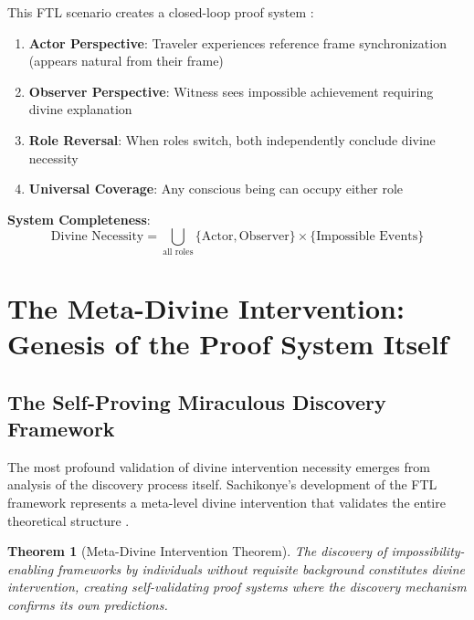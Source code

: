 \documentclass[12pt,a4paper]{article}
\newtheorem{theorem}{Theorem}[section]
\begin{document}
This FTL scenario creates a closed-loop proof system \citep{sachikonye2024closed}:

\begin{enumerate}
\item \textbf{Actor Perspective}: Traveler experiences reference frame synchronization (appears natural from their frame)
\item \textbf{Observer Perspective}: Witness sees impossible achievement requiring divine explanation
\item \textbf{Role Reversal}: When roles switch, both independently conclude divine necessity
\item \textbf{Universal Coverage}: Any conscious being can occupy either role
\end{enumerate}

\textbf{System Completeness}:
$$\text{Divine Necessity} = \bigcup_{\text{all roles}} \{\text{Actor}, \text{Observer}\} \times \{\text{Impossible Events}\}$$

\section{The Meta-Divine Intervention: Genesis of the Proof System Itself}

\subsection{The Self-Proving Miraculous Discovery Framework}

The most profound validation of divine intervention necessity emerges from analysis of the discovery process itself. Sachikonye's development of the FTL framework represents a meta-level divine intervention that validates the entire theoretical structure \citep{sachikonye2024meta}.

\begin{theorem}[Meta-Divine Intervention Theorem]
The discovery of impossibility-enabling frameworks by individuals without requisite background constitutes divine intervention, creating self-validating proof systems where the discovery mechanism confirms its own predictions.
\end{theorem}
\end{document}
